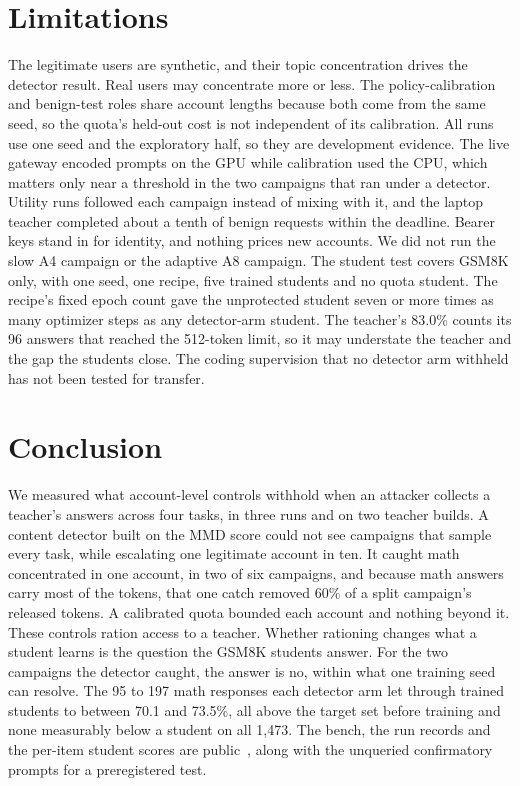 \documentclass[journal]{IEEEtran}
\begin{document}
\section{Limitations}
\label{sec:scope}
The legitimate users are synthetic, and their topic concentration drives the detector result. Real users may concentrate more or less. The policy-calibration and benign-test roles share account lengths because both come from the same seed, so the quota's held-out cost is not independent of its calibration. All runs use one seed and the exploratory half, so they are development evidence. The live gateway encoded prompts on the GPU while calibration used the CPU, which matters only near a threshold in the two campaigns that ran under a detector. Utility runs followed each campaign instead of mixing with it, and the laptop teacher completed about a tenth of benign requests within the deadline. Bearer keys stand in for identity, and nothing prices new accounts. We did not run the slow A4 campaign or the adaptive A8 campaign. The student test covers GSM8K only, with one seed, one recipe, five trained students and no quota student. The recipe's fixed epoch count gave the unprotected student seven or more times as many optimizer steps as any detector-arm student. The teacher's 83.0\% counts its 96 answers that reached the 512-token limit, so it may understate the teacher and the gap the students close. The coding supervision that no detector arm withheld has not been tested for transfer.

\section{Conclusion}
We measured what account-level controls withhold when an attacker collects a teacher's answers across four tasks, in three runs and on two teacher builds. A content detector built on the MMD score could not see campaigns that sample every task, while escalating one legitimate account in ten. It caught math concentrated in one account, in two of six campaigns, and because math answers carry most of the tokens, that one catch removed 60\% of a split campaign's released tokens. A calibrated quota bounded each account and nothing beyond it. These controls ration access to a teacher. Whether rationing changes what a student learns is the question the GSM8K students answer. For the two campaigns the detector caught, the answer is no, within what one training seed can resolve. The 95 to 197 math responses each detector arm let through trained students to between 70.1 and 73.5\%, all above the target set before training and none measurably below a student on all 1,473. The bench, the run records and the per-item student scores are public~\cite{trace2026artifact}, along with the unqueried confirmatory prompts for a preregistered test.



\end{document}
